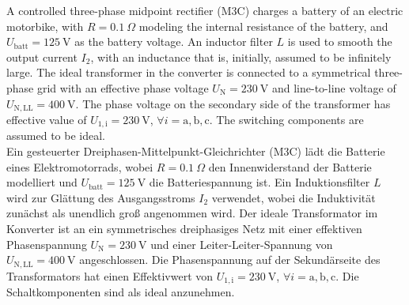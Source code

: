 

A controlled three-phase midpoint rectifier (M3C) charges a battery of an electric motorbike, with $R = \SI{0.1}{\Omega}$ modeling the internal resistance of the battery, and $U_\mathrm{batt} = \SI{125}{\volt}$ as the battery voltage. An inductor filter $L$ is used to smooth the output current $I_\mathrm{2}$, with an inductance that is, initially, assumed to be infinitely large. The ideal transformer in the converter is connected to a symmetrical three-phase grid with an effective phase voltage $U_\mathrm{N}=\SI{230}{\volt}$ and line-to-line voltage of $U_\mathrm{N,LL} = \SI{400}{\volt}$. The phase voltage on the secondary side of the transformer has effective value of $U_\mathrm{1,i} = \SI{230}{\volt}$, $\forall i=\mathrm{a, b, c}.$ The switching components are assumed to be ideal. \\
\color{gray}
Ein gesteuerter Dreiphasen-Mittelpunkt-Gleichrichter (M3C) lädt die Batterie eines Elektromotorrads, wobei $R = \SI{0,1}{\Omega}$ den Innenwiderstand der Batterie modelliert und $U_\mathrm{batt} = \SI{125}{\volt}$ die Batteriespannung ist. Ein
Induktionsfilter $L$ wird zur Glättung des Ausgangsstroms $I_\mathrm{2}$ verwendet, wobei die Induktivität zunächst als unendlich groß angenommen wird. Der ideale Transformator im Konverter ist an ein symmetrisches dreiphasiges Netz mit einer effektiven Phasenspannung $U_\mathrm{N}=\SI{230}{\volt}$ und einer Leiter-Leiter-Spannung von $U_\mathrm{N,LL} = \SI{400}{\volt}$ angeschlossen. Die Phasenspannung auf der Sekundärseite des Transformators hat einen Effektivwert von $U_\mathrm{1,i} = \SI{230}{\volt}$, $\forall i=\mathrm{a, b, c}.$ Die Schaltkomponenten sind als ideal anzunehmen.
\color{black}



